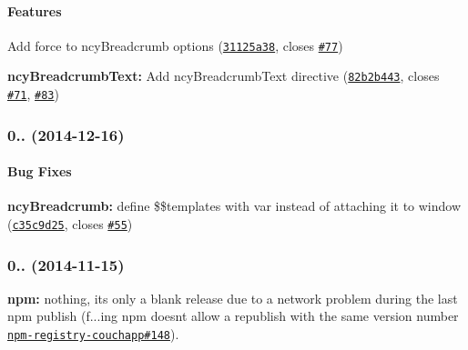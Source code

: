 \paragraph*{Features}


\begin{DoxyItemize}
\item Add force to ncy\+Breadcrumb options (\href{http://github.com/ncuillery/angular-breadcrumb/commit/31125a386d706dd76df807b3b02e1fccea38fb59}{\tt 31125a38}, closes \href{http://github.com/ncuillery/angular-breadcrumb/issues/78}{\tt \#77})
\item {\bfseries ncy\+Breadcrumb\+Text\+:} Add ncy\+Breadcrumb\+Text directive (\href{http://github.com/ncuillery/angular-breadcrumb/commit/82b2b443fab220cd9ac7d3a8c90c1edc4291e54a}{\tt 82b2b443}, closes \href{http://github.com/ncuillery/angular-breadcrumb/issues/71}{\tt \#71}, \href{http://github.com/ncuillery/angular-breadcrumb/issues/83}{\tt \#83})
\end{DoxyItemize}

\label{_0.3.3}%
 \subsubsection*{0.. (2014-\/12-\/16)}

\paragraph*{Bug Fixes}


\begin{DoxyItemize}
\item {\bfseries ncy\+Breadcrumb\+:} define {\ttfamily \$\$templates} with var instead of attaching it to {\ttfamily window} (\href{http://github.com/ncuillery/angular-breadcrumb/commit/c35c9d255b5e2585d225a961d1efdb51d18f6a55}{\tt c35c9d25}, closes \href{http://github.com/ncuillery/angular-breadcrumb/issues/55}{\tt \#55})
\end{DoxyItemize}

\label{_0.3.2}%
 \subsubsection*{0.. (2014-\/11-\/15)}


\begin{DoxyItemize}
\item {\bfseries npm\+:} nothing, it\textquotesingle{}s only a blank release due to a network problem during the last {\ttfamily npm publish} (f...ing npm doesn\textquotesingle{}t allow a republish with the same version number \href{https://github.com/npm/npm-registry-couchapp/issues/148}{\tt npm-\/registry-\/couchapp\#148}).
\end{DoxyItemize}

